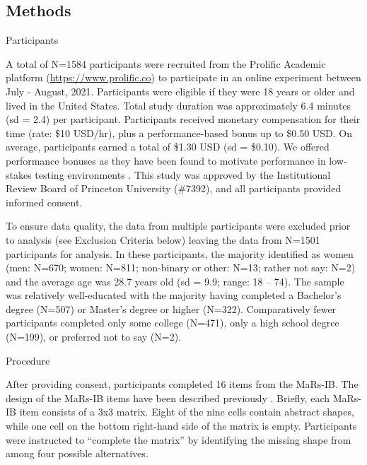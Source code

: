\documentclass[a4paper,man,natbib]{apa6}
\makeatletter
\renewcommand{\subsubsection}{\@startsection{subsubsection}{3}
  {\z@}%
  {\b@level@two@skip}{\e@level@two@skip}%
  {\normalfont\normalsize\bfseries}}
\makeatother
\begin{document}
\subsection{Methods}

\subsubsection{Participants} 

A total of N=1584 participants were recruited from the Prolific Academic platform (\url{https://www.prolific.co}) to participate in an online experiment between July - August, 2021. Participants were eligible if they were 18 years or older and lived in the United States. Total study duration was approximately 6.4 minutes (sd = 2.4) per participant. Participants received monetary compensation for their time (rate: \$10 USD/hr), plus a performance-based bonus up to \$0.50 USD. On average, participants earned a total of \$1.30 USD (sd = \$0.10). We offered performance bonuses as they have been found to motivate performance in low-stakes testing environments \citep{duckworth2011role, gignac2018moderate}. This study was approved by the Institutional Review Board of Princeton University (\#7392), and all participants provided informed consent.

To ensure data quality, the data from multiple participants were excluded prior to analysis (see Exclusion Criteria below) leaving the data from N=1501 participants for analysis. In these participants, the majority identified as women (men: N=670; women: N=811; non-binary or other: N=13; rather not say: N=2) and the average age was 28.7 years old (sd = 9.9; range: 18 -- 74). The sample was relatively well-educated with the majority having completed a Bachelor's degree (N=507) or Master's degree or higher (N=322). Comparatively fewer participants completed only some college (N=471), only a high school degree (N=199), or preferred not to say (N=2). 

\subsubsection{Procedure}

After providing consent, participants completed 16 items from the MaRs-IB. The design of the MaRs-IB items have been described previously \citep{chierchia2019matrix}. Briefly, each MaRs-IB item consists of a 3x3 matrix. Eight of the nine cells contain abstract shapes, while one cell on the bottom right-hand side of the matrix is empty. Participants were instructed to ``complete the matrix'' by identifying the missing shape from among four possible alternatives. 
\end{document}
